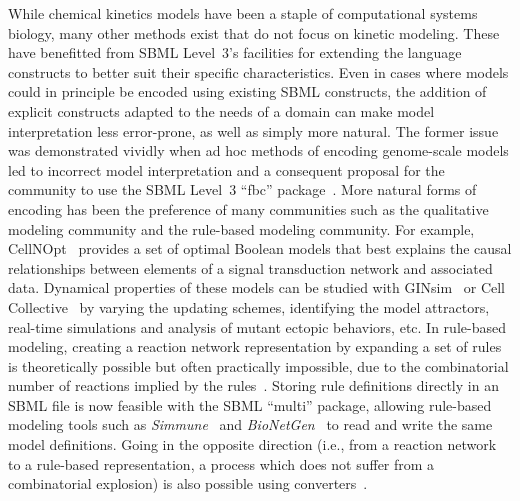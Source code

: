\documentclass[]{draft-sbml-paper}
\begin{document}
While chemical kinetics models have been a staple of computational systems biology, many other methods exist that do not focus on kinetic modeling.  These have benefitted from SBML Level~3's facilities for extending the language constructs to better suit their specific characteristics.  Even in cases where models could in principle be encoded using existing SBML constructs, the addition of explicit constructs adapted to the needs of a domain can make model interpretation less error-prone, as well as simply more natural.  The former issue was demonstrated vividly when ad hoc methods of encoding genome-scale models led to incorrect model interpretation and a consequent proposal for the community to use the SBML Level~3 ``fbc'' package~\citep{Ebrahim2015}.  More natural forms of encoding has been the preference of many communities such as the qualitative modeling community and the rule-based modeling community.  For example, CellNOpt~\citep{terfve2012cellnoptr} provides a set of optimal Boolean models that best explains the causal relationships between elements of a signal transduction network and associated data.  Dynamical properties of these models can be studied with GINsim~\citep{chaouiya2012logical} or Cell Collective~\citep{helikar2012cell} by varying the updating schemes, identifying the model attractors, real-time simulations and analysis of mutant ectopic behaviors, etc.  In rule-based modeling, creating a reaction network representation by expanding a set of rules is theoretically possible but often practically impossible, due to the combinatorial number of reactions implied by the rules~\citep{Hlavacek2003complexity}.  Storing rule definitions directly in an SBML file is now feasible with the SBML ``multi'' package, allowing rule-based modeling tools such as \emph{Simmune}~\citep{zhang2013simmune} and \emph{BioNetGen}~\citep{faeder2009rule, Harris2016bionetgen} to read and write the same model definitions.  Going in the opposite direction (i.e., from a reaction network to a rule-based representation, a process which does not suffer from a combinatorial explosion) is also possible using converters~\citep{Tapia2013atomizer}.

\end{document}
